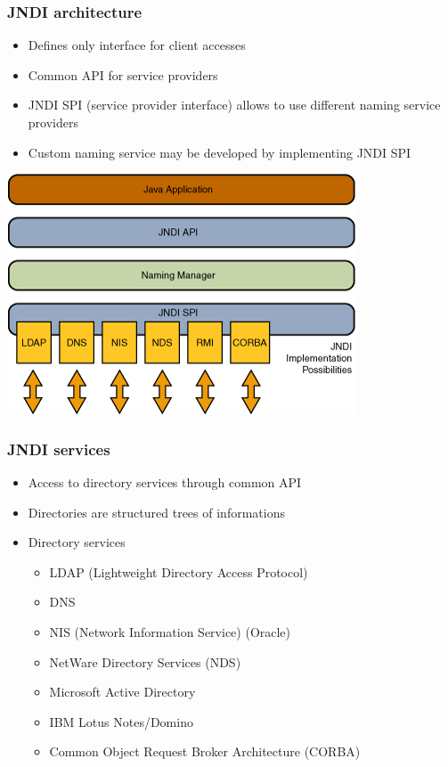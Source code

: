 \documentclass[10pt,xcolor=pdflatex]{beamer}
\begin{document}
\begin{frame}[containsverbatim]\frametitle{JNDI architecture}
\begin{itemize}
	\item Defines only interface for client accesses
	\item Common API for service providers
	\item JNDI SPI (service provider interface) allows to use different naming service providers
	\item Custom naming service may be developed by implementing JNDI SPI
\end{itemize}
\begin{center}
\includegraphics[scale=0.77]{img/obr6}
\end{center}
\end{frame}


\begin{frame}[containsverbatim]\frametitle{JNDI services}
\begin{itemize}
	\item Access to directory services through common API
	\item Directories are structured trees of informations
	\item Directory services
    \begin{itemize}
    	\item LDAP (Lightweight Directory Access Protocol)
    	\item DNS
    	\item NIS (Network Information Service) (Oracle)
    	\item NetWare Directory Services (NDS)
		\item Microsoft Active Directory
		\item IBM Lotus Notes/Domino
		\item Common Object Request Broker Architecture (CORBA)
    \end{itemize}
\end{itemize}
\end{frame}
\end{document}
